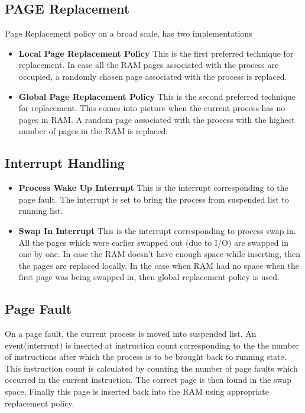 \documentclass[paper=a4, fontsize=11pt,twoside]{scrartcl}   %
\begin{document}
   \subsection{PAGE Replacement} Page Replacement policy on a broad scale, has two implementations
        \begin{itemize}
            \item \textbf{Local Page Replacement Policy} This is the first preferred technique for replacement. In case all the RAM pages associated with the process are occupied, a randomly chosen page associated with the process is replaced.
            \item \textbf{Global Page Replacement Policy} This is the second preferred technique for replacement. This comes into picture when the current process has no pages in RAM. A random page associated with the process with the highest number of pages in the RAM is replaced.
          
          \end{itemize}
    \subsection{Interrupt Handling}
    \begin{itemize}
    \item \textbf{Process Wake Up Interrupt} This is the interrupt corresponding to the page fault. The interrupt is set to bring the process from suspended list to running list.
    \item \textbf{Swap In Interrupt} This is the interrupt corresponding to process swap in. All the pages which were earlier swapped out (due to I/O) are swapped in one by one. In case the RAM doesn't have enough space while inserting, then the pages are replaced locally. In the case when RAM had no space when the first page was being swapped in, then global replacement policy is used.
    \end{itemize}
    \subsection{Page Fault} On a page fault, the current process is moved into suspended list. An event(interrupt) is inserted at instruction count corresponding to the the number of instructions after which the process is to be brought back to running state. This instruction count is calculated by counting the number of page faults which occurred in the current instruction.
The correct page is then found in the swap space.
Finally this page is inserted back into the RAM using appropriate replacement policy.
\end{document}
